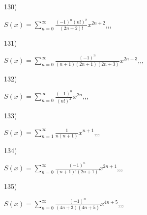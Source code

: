 \documentclass[11pt, ukrainian]{article}
\begin{document}
\vspace{0.9cm}
130) \space 
{%
{$S(x)=\sum\limits_{n=0}^{\infty}{\frac{{(-1)^n}{(n!)^2}}{(2n+2)!}}{x^{{2n+2}}}$},,, \par \smallskip  
}
\par
\newpage
131) \space 
{%
{$S(x)=\sum\limits_{n=0}^{\infty}{\frac{(-1)^n}{(n+1)(2n+1)(2n+3)}}{x^{{2n+3}}}$},,, \par \smallskip  
}
\par
\vspace{0.9cm}
132) \space 
{%
{$S(x)=\sum\limits_{n=0}^{\infty}{\frac{(-1)^n}{(n!)^2}}{x^{{2n}}}$},,, \par \smallskip  
}
\par
\vspace{0.9cm}
133) \space 
{%
{$S(x)=\sum\limits_{n=1}^{\infty}{\frac{1}{n(n+1)}}{x^{{n+1}}}$},,, \par \smallskip  
}
\par
\vspace{0.9cm}
134) \space 
{%
{$S(x)=\sum\limits_{n=0}^{\infty}{\frac{(-1)^n}{(n+1)!(2n+1)}}{x^{{2n+1}}}$},,, \par \smallskip  
}
\par
\vspace{0.9cm}
135) \space 
{%
{$S(x)=\sum\limits_{n=0}^{\infty}{\frac{(-1)^n}{(4n+3)(4n+5)}}{x^{{4n+5}}}$},,, \par \smallskip  
}
\end{document}
